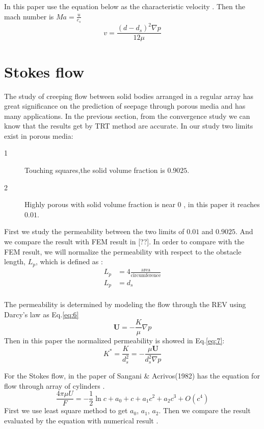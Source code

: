 \documentclass{article}
\begin{document}
In this paper use the equation below as the characteristic velocity . Then the mach number is $Ma=\frac{u}{c_s}$
\begin{equation}\label{eq:3}
  v = \frac{(d-d_s)^2\nabla p}{12\mu}
\end{equation}

\section{\label{sec:level1}Stokes flow}
The study of creeping flow between solid bodies arranged in a regular array has great significance on the prediction of seepage through
porous media and has many applications. In the previous section, from the convergence study we can know that the results get by TRT method
are accurate. In our study two limits exist in porous media:
\begin{description}
  \item[1] Touching squares,the solid volume fraction is $0.9025$.
  \item[2] Highly porous with solid volume fraction is near 0 , in this paper it reaches $0.01$.
\end{description}
First we study the permeability between the two limits of $0.01$ and $0.9025$. And we compare the result with FEM result in [??]. In order to compare with
the FEM result, we will normalize the permeability with respect to the obstacle length, $L_p$, which is defined as :
\begin{subequations}\label{eq:Lp}
   \begin{align}
     L_p &=4\frac{\text{area}}{\text{circumference}} \\
     L_p &= d_s   \\
   \end{align}
\end{subequations}


The permeability is determined by modeling the flow through the REV using Darcy's law as Eq.\ref{eq:6}
\begin{equation}\label{eq:6}
  \bm{U} = -\frac{K}{\mu}\nabla p
\end{equation}
Then in this paper the normalized permeability is showed in Eq.\ref{eq:7}:
\begin{equation}\label{eq:7}
  K^\ast = \frac{K}{d^2_s}=-\frac{\mu\bm{U}}{d^2_s\nabla p }
\end{equation}

For the Stokes flow, in the paper of Sangani \& Acrivos(1982) has the equation for flow through array of cylinders .
   \begin{equation}
   \frac{4\pi \mu U}{F}=-\frac{1}{2}\ln c+a_0+c+a_1 c^2 +a_2 c^3+O(c^4)
   \end{equation}
First we use least square method to get $a_0$, $a_1$, $a_2$. Then we compare the result evaluated by the equation with numerical result .
\end{document}
